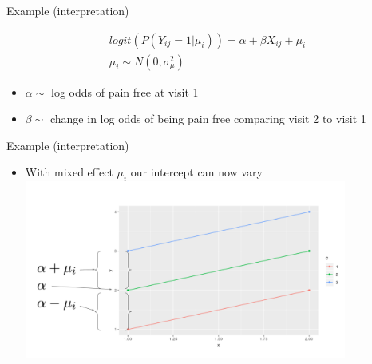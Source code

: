 \documentclass[ignorenonframetext,]{beamer}
\providecommand{\tightlist}{%
  \setlength{\itemsep}{0pt}\setlength{\parskip}{0pt}}
\begin{document}
\begin{frame}{Example (interpretation)}

\[
\begin{aligned}
logit(P(Y_{ij}=1|\mu_i)) = \alpha + \beta X_{ij} + \mu_i \\
\mu_i \sim N(0, \sigma^2_{\mu})
\end{aligned}
\]

\begin{itemize}
\tightlist
\item
  \(\alpha \sim\) log odds of pain free at visit 1
\item
  \(\beta \sim\) change in log odds of being pain free comparing visit 2
  to visit 1
\end{itemize}

\end{frame}

\begin{frame}{Example (interpretation)}

\begin{itemize}
\tightlist
\item
  With mixed effect \(\mu_i\) our intercept can now vary
  \includegraphics[width=4.16667in]{img_mixed.png}
\end{itemize}

\end{frame}
\end{document}
